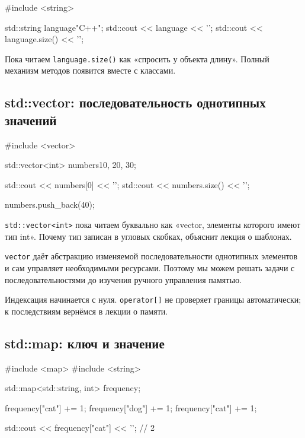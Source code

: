 \begin{cppcode}
#include <string>

std::string language{"C++"};
std::cout << language << '\n';
std::cout << language.size() << '\n';
\end{cppcode}

Пока читаем \texttt{language.size()} как «спросить у объекта длину».
Полный механизм методов появится вместе с классами.

\subsection{std::vector: последовательность однотипных значений}

\begin{cppcode}
#include <vector>

std::vector<int> numbers{10, 20, 30};

std::cout << numbers[0] << '\n';
std::cout << numbers.size() << '\n';

numbers.push_back(40);
\end{cppcode}

\texttt{std::vector<int>} пока читаем буквально как
«vector, элементы которого имеют тип int». Почему тип записан в угловых
скобках, объяснит лекция о шаблонах.

\begin{importantbox}
\texttt{vector} даёт абстракцию изменяемой последовательности однотипных
элементов и сам управляет необходимыми ресурсами. Поэтому мы можем решать
задачи с последовательностями до изучения ручного управления памятью.
\end{importantbox}

Индексация начинается с нуля. \texttt{operator[]} не проверяет границы
автоматически; к последствиям вернёмся в лекции о памяти.

\subsection{std::map: ключ и значение}

\begin{cppcode}
#include <map>
#include <string>

std::map<std::string, int> frequency;

frequency["cat"] += 1;
frequency["dog"] += 1;
frequency["cat"] += 1;

std::cout << frequency["cat"] << '\n'; // 2
\end{cppcode}

